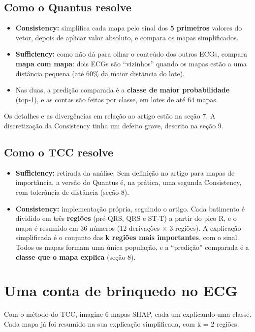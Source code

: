 \documentclass[11pt,a4paper]{article}
\begin{document}
\subsection{Como o Quantus resolve}
\begin{itemize}
\item \textbf{Consistency:} simplifica cada mapa pelo sinal dos \textbf{5 primeiros} valores do vetor, depois de aplicar valor absoluto, e compara os mapas simplificados.
\item \textbf{Sufficiency:} como não dá para olhar o conteúdo dos outros ECGs, compara \textbf{mapa com mapa}: dois ECGs são “vizinhos” quando os mapas estão a uma distância pequena (até 60\% da maior distância do lote).
\item Nas duas, a predição comparada é a \textbf{classe de maior probabilidade} (top‑1), e as contas são feitas por classe, em lotes de até 64 mapas.
\end{itemize}
Os detalhes e as divergências em relação ao artigo estão na seção 7. A discretização da Consistency tinha um defeito grave, descrito na seção 9.

\subsection{Como o TCC resolve}
\begin{itemize}
\item \textbf{Sufficiency:} retirada da análise. Sem definição no artigo para mapas de importância, a versão do Quantus é, na prática, uma segunda Consistency, com tolerância de distância (seção 8).
\item \textbf{Consistency:} implementação própria, seguindo o artigo. Cada batimento é dividido em três \textbf{regiões} (pré‑QRS, QRS e ST‑T) a partir do pico R, e o mapa é resumido em 36 números (12 derivações × 3 regiões). A explicação simplificada é o conjunto das \textbf{k regiões mais importantes}, com o sinal. Todos os mapas formam uma única população, e a “predição” comparada é a \textbf{classe que o mapa explica} (seção 8).
\end{itemize}

\section{Uma conta de brinquedo no ECG}

Com o método do TCC, imagine 6 mapas SHAP, cada um explicando uma classe. Cada mapa já foi resumido na sua explicação simplificada, com k = 2 regiões:
\end{document}
